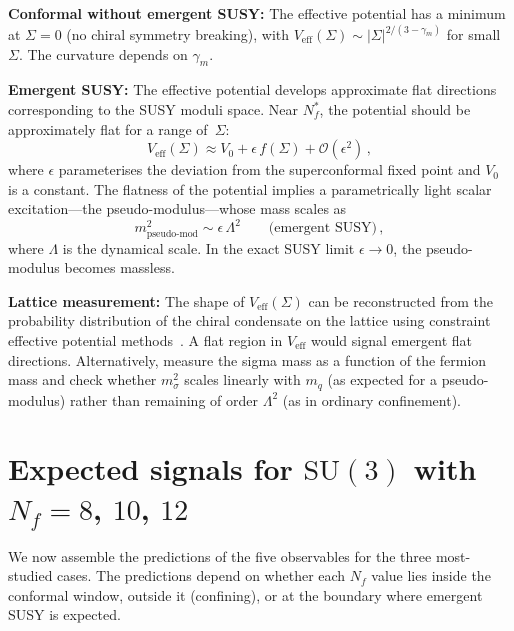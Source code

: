 \documentclass[11pt,a4paper]{article}
\theoremstyle{plain}
\theoremstyle{definition}
\theoremstyle{remark}
\newcommand{\Nf}{N_{\!f}}
\newcommand{\Nfstar}{\Nf^*}
\newcommand{\SU}[1]{\mathrm{SU}(#1)}
\begin{document}
\textbf{Conformal without emergent SUSY:}  The effective potential
has a minimum at $\Sigma = 0$ (no chiral symmetry breaking), with
$V_{\mathrm{eff}}(\Sigma) \sim |\Sigma|^{2/(3-\gamma_m)}$ for small
$\Sigma$.  The curvature depends on $\gamma_m$.

\textbf{Emergent SUSY:}  The effective potential develops approximate
flat directions corresponding to the SUSY moduli space.  Near $\Nfstar$,
the potential should be approximately flat for a range of~$\Sigma$:
\begin{equation}\label{eq:flat-direction}
  V_{\mathrm{eff}}(\Sigma) \approx
  V_0 + \epsilon\,f(\Sigma) + \mathcal{O}(\epsilon^2)\,,
\end{equation}
where $\epsilon$ parameterises the deviation from the superconformal
fixed point and $V_0$ is a constant.  The flatness of the potential
implies a parametrically light scalar excitation---the pseudo-modulus---whose mass
scales as
\begin{equation}\label{eq:pseudo-modulus-mass}
  \boxed{
    m_{\mathrm{pseudo\text{-}mod}}^2 \sim \epsilon\,\Lambda^2
    \qquad\text{(emergent SUSY)}\,,
  }
\end{equation}
where $\Lambda$ is the dynamical scale.  In the exact SUSY limit
$\epsilon \to 0$, the pseudo-modulus becomes massless.

\textbf{Lattice measurement:}  The shape of $V_{\mathrm{eff}}(\Sigma)$
can be reconstructed from the probability distribution of the chiral
condensate on the lattice using constraint
effective potential methods~\cite{CEP}.  A flat region in
$V_{\mathrm{eff}}$ would signal emergent flat directions.
Alternatively, measure the sigma mass as a function of the fermion
mass and check whether $m_\sigma^2$ scales linearly with $m_q$ (as
expected for a pseudo-modulus) rather than remaining of order
$\Lambda^2$ (as in ordinary confinement).


\section{Expected signals for $\SU{3}$ with $\Nf = 8$, $10$, $12$}
\label{sec:predictions}

We now assemble the predictions of the five observables for the three
most-studied cases.  The predictions depend on whether each $\Nf$
value lies inside the conformal window, outside it (confining), or at
the boundary where emergent SUSY is expected.
\end{document}
